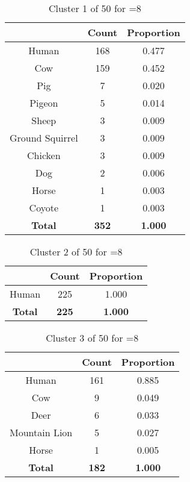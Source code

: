 \begin{table}[ht!]
\centering
\begin{tabular}{|c|c|c|}
\hline
\bf \Spec{} &\bf Count &\bf Proportion\\ \hline \hline
Human & 168 & 0.477\\ \hline
Cow & 159 & 0.452\\ \hline
Pig & 7 & 0.020\\ \hline
Pigeon & 5 & 0.014\\ \hline
Sheep & 3 & 0.009\\ \hline
Ground Squirrel & 3 & 0.009\\ \hline
Chicken & 3 & 0.009\\ \hline
Dog & 2 & 0.006\\ \hline
Horse & 1 & 0.003\\ \hline
Coyote & 1 & 0.003\\ \hline
\hline
\bf Total & \bf 352 & \bf 1.000\\ \hline
\end{tabular}
\label{tab:cluster:1:8}
\caption{Cluster 1 of 50 for \minneigh{}=8}
\end{table}

\begin{table}[ht!]
\centering
\begin{tabular}{|c|c|c|}
\hline
\bf \Spec{} &\bf Count &\bf Proportion\\ \hline \hline
Human & 225 & 1.000\\ \hline
\hline
\bf Total & \bf 225 & \bf 1.000\\ \hline
\end{tabular}
\label{tab:cluster:2:8}
\caption{Cluster 2 of 50 for \minneigh{}=8}
\end{table}

\begin{table}[ht!]
\centering
\begin{tabular}{|c|c|c|}
\hline
\bf \Spec{} &\bf Count &\bf Proportion\\ \hline \hline
Human & 161 & 0.885\\ \hline
Cow & 9 & 0.049\\ \hline
Deer & 6 & 0.033\\ \hline
Mountain Lion & 5 & 0.027\\ \hline
Horse & 1 & 0.005\\ \hline
\hline
\bf Total & \bf 182 & \bf 1.000\\ \hline
\end{tabular}
\label{tab:cluster:3:8}
\caption{Cluster 3 of 50 for \minneigh{}=8}
\end{table}

